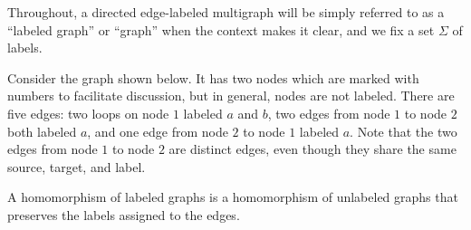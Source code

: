     Throughout, a directed edge-labeled multigraph will be simply referred to as a \enquote{labeled graph} or \enquote{graph} when the context makes it clear, and we fix a set $\Sigma$ of labels.



\begin{example}
    Consider the graph shown 
    below.
    It has two nodes which are marked with numbers to facilitate discussion, but in general, nodes are not labeled.
    There are five edges: two loops on node $1$ labeled \(a\) and \(b\), two edges from node $1$ to node $2$ both labeled \(a\), and one edge from node $2$ to node $1$ labeled \(a\). Note that the two edges from node $1$ to node $2$ are distinct edges, even though they share the same source, target, and label.

    \begin{center}
    \end{center}


\end{example}
  A homomorphism of labeled graphs is a homomorphism of unlabeled graphs that preserves the labels assigned to the edges. 